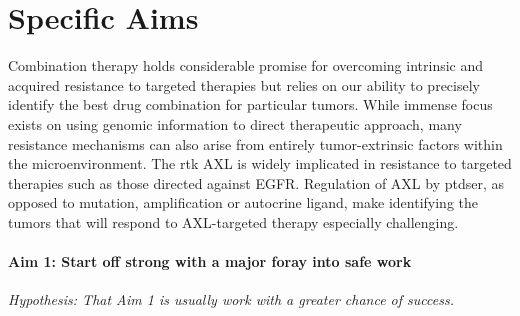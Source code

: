 \newcommand{\SpecificAimOne}{Start off strong with a major foray into safe work}
\newcommand{\SpecificAimOneA}{A task that comes with convincing preliminary data}
\newcommand{\SpecificAimOneB}{Another task that is essential to the later efforts}
\newcommand{\SpecificAimOneC}{One more task that needs to be accomplished early on in the project}
\newcommand{\SpecificAimOneD}{Validate model predictions of the relationship between signaling network state and resistance}

\newcommand{\SpecificAimTwo}{That middle area where you will probably end up spending most of your time}
\newcommand{\SpecificAimTwoA}{One of those tasks that just could not be skipped}
\newcommand{\SpecificAimTwoB}{A task I am really looking forward to}
\newcommand{\SpecificAimTwoC}{Something pulling this whole aim together}

\newcommand{\SpecificAimThree}{A third major area that is quite risky}
\newcommand{\SpecificAimThreeA}{Since we are just warming up this task is more likely to be feasible}
\newcommand{\SpecificAimThreeB}{Getting this to happen will really be quite pricey}
\newcommand{\SpecificAimThreeC}{This task really pulls everything together but will require everything working perfectly}


\section{Specific Aims}

Combination therapy holds considerable promise for overcoming intrinsic and acquired resistance to targeted therapies but relies on our ability to precisely identify the best drug combination for particular tumors. While immense focus exists on using genomic information to direct therapeutic approach, many resistance mechanisms can also arise from entirely tumor-extrinsic factors within the microenvironment. The \gls{rtk} AXL is widely implicated in resistance to targeted therapies such as those directed against EGFR. Regulation of AXL by \gls{ptdser}, as opposed to mutation, amplification or autocrine ligand, make identifying the tumors that will respond to AXL-targeted therapy especially challenging\cite{Meyer:CellSys}.

\paragraph*{Aim 1: \SpecificAimOne} \emph{Hypothesis: That Aim 1 is usually work with a greater chance of success.}

